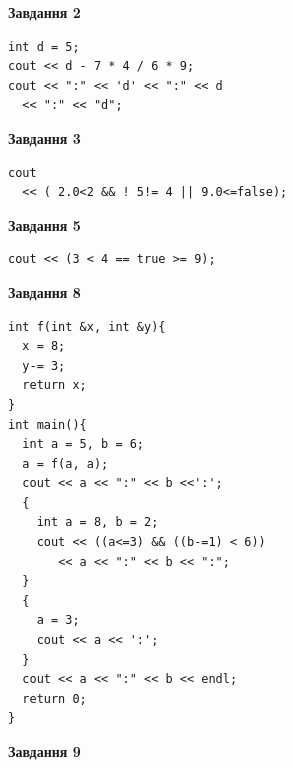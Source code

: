 \documentclass[12pt, ukrainian]{article}
\begin{document}
{\begin {large}
\begin{minipage}[t]{7.0cm}
\end{minipage}
\vline \hspace{1mm}
\begin{minipage}[t]{11.0cm}

\begin{center}
\textbf{Завдання 2}
\end{center}
\vspace{-8mm}

\begin{verbatim}
int d = 5;
cout << d - 7 * 4 / 6 * 9;
cout << ":" << 'd' << ":" << d 
  << ":" << "d";
\end{verbatim}



\begin{center}
\textbf{Завдання 3}
\end{center}
\vspace{-8mm}

\begin{verbatim}
cout 
  << ( 2.0<2 && ! 5!= 4 || 9.0<=false);
\end{verbatim}



\begin{center}
\textbf{Завдання 5}
\end{center}
\vspace{-8mm}

\begin{verbatim}
cout << (3 < 4 == true >= 9);
\end{verbatim}



\begin{center}
\textbf{Завдання 8}
\end{center}
\vspace{-8mm}

\begin{verbatim}
int f(int &x, int &y){
  x = 8;
  y-= 3;
  return x;
}
int main(){
  int a = 5, b = 6;
  a = f(a, a);
  cout << a << ":" << b <<':';
  {
    int a = 8, b = 2;
    cout << ((a<=3) && ((b-=1) < 6))
       << a << ":" << b << ":";
  }
  {
    a = 3;
    cout << a << ':';
  }
  cout << a << ":" << b << endl;
  return 0;
}
\end{verbatim}

\end{minipage}


\begin{minipage}[t]{7.0cm}

\begin{center}
\textbf{Завдання 9}
\end{center}
\vspace{-8mm}


\end{minipage}
\end{large}}
\end{document}
